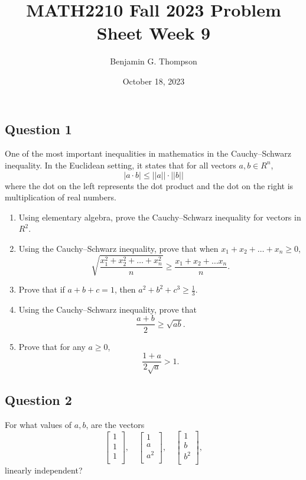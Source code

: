\documentclass[12pt, a4paper]{article}
\title{MATH2210 Fall 2023 Problem Sheet Week 9}
\author{Benjamin G. Thompson}
\date{October 18, 2023}
\begin{document}
\subsection*{Question 1}
One of the most important inequalities in mathematics in the Cauchy–Schwarz inequality. In the Euclidean setting, it states that for all vectors $a, b \in R^n$,
\[
| a \cdot b | \leq ||a || \cdot ||b ||
\]
where the dot on the left represents the dot product and the dot on the right is multiplication of real numbers.

\begin{enumerate}
	\item Using elementary algebra, prove the Cauchy–Schwarz inequality for vectors in $R^2$.
	\item Using the Cauchy–Schwarz inequality, prove that when $x_1 + x_2 + \ldots + x_n \geq 0$, 
	\[
	\sqrt{\frac{x_1^2 + x_2^2 + \ldots + x_n^2}{n}} \geq \frac{x_1 + x_2 + \ldots x_n}{n}.
	\]
	\item Prove that if $a + b + c =1$, then $a^2 + b^2 + c^3 \geq \frac{1}{3}$.
	\item Using the Cauchy–Schwarz inequality, prove that
	\[
	\frac{a + b}{2} \geq \sqrt{ab}.
	\] 
	\item Prove that for any $a \geq 0$,
	\[
	\frac{1 + a}{2\sqrt{a}} > 1.
	\]
\end{enumerate}

\subsection*{Question 2}
For what values of $a,b$, are the vectors
\[
\begin{bmatrix}
1 \\
1 \\
1 \\
\end{bmatrix}, \quad
\begin{bmatrix}
1 \\
a \\
a^2 \\
\end{bmatrix}, \quad
\begin{bmatrix}
1 \\
b \\
b^2 \\
\end{bmatrix},
\]
linearly independent?
\end{document}
